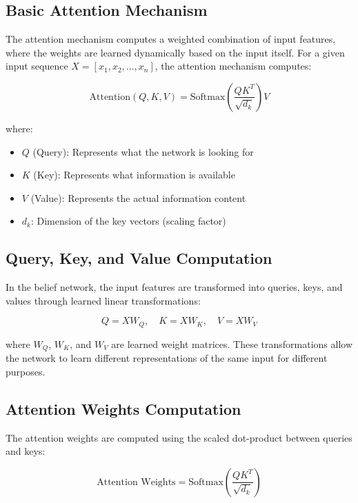 \documentclass[conference]{IEEEtran}
\begin{document}
\subsection{Basic Attention Mechanism}

The attention mechanism computes a weighted combination of input features, where the weights are learned dynamically based on the input itself. For a given input sequence $X = [x_1, x_2, ..., x_n]$, the attention mechanism computes:

\begin{equation}
\text{Attention}(Q, K, V) = \text{Softmax}\left(\frac{QK^T}{\sqrt{d_k}}\right)V
\end{equation}

where:
\begin{itemize}
    \item $Q$ (Query): Represents what the network is looking for
    \item $K$ (Key): Represents what information is available
    \item $V$ (Value): Represents the actual information content
    \item $d_k$: Dimension of the key vectors (scaling factor)
\end{itemize}

\subsection{Query, Key, and Value Computation}

In the belief network, the input features are transformed into queries, keys, and values through learned linear transformations:

\begin{equation}
Q = XW_Q, \quad K = XW_K, \quad V = XW_V
\end{equation}

where $W_Q$, $W_K$, and $W_V$ are learned weight matrices. These transformations allow the network to learn different representations of the same input for different purposes.

\subsection{Attention Weights Computation}

The attention weights are computed using the scaled dot-product between queries and keys:

\begin{equation}
\text{Attention Weights} = \text{Softmax}\left(\frac{QK^T}{\sqrt{d_k}}\right)
\end{equation}
\end{document}
